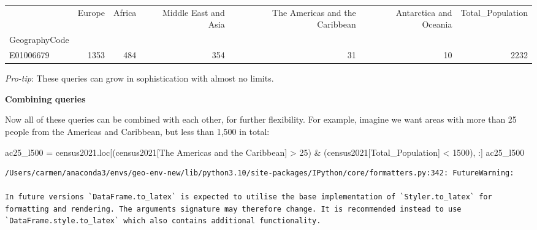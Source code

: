 \documentclass[
  letterpaper,
  DIV=11,
  numbers=noendperiod]{scrreprt}
\newenvironment{Shaded}{\begin{snugshade}}{\end{snugshade}}
\newcommand{\DecValTok}[1]{\textcolor[rgb]{0.68,0.00,0.00}{#1}}
\newcommand{\NormalTok}[1]{\textcolor[rgb]{0.00,0.23,0.31}{#1}}
\newcommand{\OperatorTok}[1]{\textcolor[rgb]{0.37,0.37,0.37}{#1}}
\newcommand{\StringTok}[1]{\textcolor[rgb]{0.13,0.47,0.30}{#1}}
\begin{document}
\begin{tabular}{lrrrrrr}
\toprule
{} &  Europe &  Africa &  Middle East and Asia &  The Americas and the Caribbean &  Antarctica and Oceania &  Total\_Population \\
GeographyCode &         &         &                       &                                 &                         &                   \\
\midrule
E01006679     &    1353 &     484 &                   354 &                              31 &                      10 &              2232 \\
\bottomrule
\end{tabular}

\emph{Pro-tip}: These queries can grow in sophistication with almost no
limits.

\textbf{Combining queries}

Now all of these queries can be combined with each other, for further
flexibility. For example, imagine we want areas with more than 25 people
from the Americas and Caribbean, but less than 1,500 in total:

\begin{Shaded}
\begin{Highlighting}[]
\NormalTok{ac25\_l500 }\OperatorTok{=}\NormalTok{ census2021.loc[(census2021[}\StringTok{\textquotesingle{}The Americas and the Caribbean\textquotesingle{}}\NormalTok{] }\OperatorTok{\textgreater{}} \DecValTok{25}\NormalTok{) }\OperatorTok{\&}\NormalTok{                    (census2021[}\StringTok{\textquotesingle{}Total\_Population\textquotesingle{}}\NormalTok{] }\OperatorTok{\textless{}} \DecValTok{1500}\NormalTok{), :]}
\NormalTok{ac25\_l500}
\end{Highlighting}
\end{Shaded}

\begin{verbatim}
/Users/carmen/anaconda3/envs/geo-env-new/lib/python3.10/site-packages/IPython/core/formatters.py:342: FutureWarning:

In future versions `DataFrame.to_latex` is expected to utilise the base implementation of `Styler.to_latex` for formatting and rendering. The arguments signature may therefore change. It is recommended instead to use `DataFrame.style.to_latex` which also contains additional functionality.
\end{verbatim}
\end{document}
